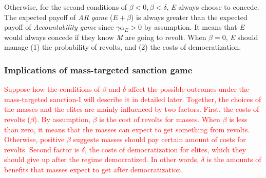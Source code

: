 \documentclass[11pt, letterpage]{article}
\begin{document}
Otherwise, for the second conditions of $\beta <0, \beta < \delta$, \textit{E} always choose to concede. The expected payoff of \textit{AR game} ($E + \beta$) is always greater than the expected payoff of \textit{Accountability game} since $\gamma\alpha_{E} > 0$ by assumption. It means that \textit{E} would always concede if they know \textit{M} are going to revolt. When $\beta = 0$, \textit{E} should manage (1) the probability of revolts, and (2) the costs of democratization.
	
\subsubsection*{Implications of mass-targeted sanction game}

\textcolor{red}{Suppose how the conditions of $\beta$ and $\delta$ affect the possible outcomes under the mass-targeted sanction-I will describe it in detailed later.	Together, the choices of the masses and the elites are mainly influenced by two factors. First, the costs of revolts ($\beta$). By assumption, $\beta$ is the cost of revolts for masses. When $\beta$ is less than zero, it means that the masses can expect to get something from revolts. Otherwise, positive $\beta$ suggests masses should pay certain amount of costs for revolts. Second factor is $\delta$, the costs of democratization for elites, which they should give up after the regime democratized. In other words, $\delta$ is the amounts of benefits that masses expect to get after democratization.}
\end{document}
